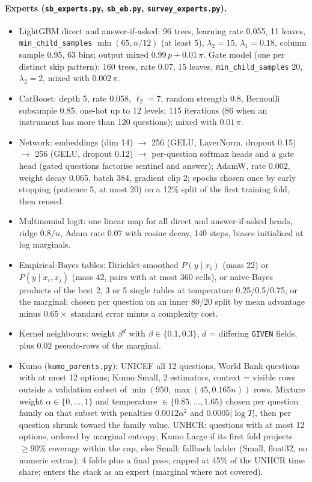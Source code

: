 \paragraph{Experts (\texttt{sb\_experts.py}, \texttt{sb\_eb.py}, \texttt{survey\_experts.py}).}
\begin{itemize}[leftmargin=*,itemsep=1pt]
\item LightGBM direct and answer-if-asked: 96 trees, learning rate 0.055, 11 leaves, \texttt{min\_child\_samples} $\min(65,n/12)$ (at least 5), $\lambda_2=15$, $\lambda_1=0.18$, column sample 0.95, 63 bins; output mixed $0.99\,p+0.01\,\pi$. Gate model (one per distinct skip pattern): 160 trees, rate 0.07, 15 leaves, \texttt{min\_child\_samples} 20, $\lambda_2=2$, mixed with $0.002\,\pi$.
\item CatBoost: depth 5, rate 0.058, $\ell_2=7$, random strength 0.8, Bernoulli subsample 0.85, one-hot up to 12 levels; 115 iterations (86 when an instrument has more than 120 questions); mixed with $0.01\,\pi$.
\item Network: embeddings (dim 14) $\to$ 256 (GELU, LayerNorm, dropout 0.15) $\to$ 256 (GELU, dropout 0.12) $\to$ per-question softmax heads and a gate head (gated questions factorise sentinel and answer); AdamW, rate 0.002, weight decay 0.065, batch 384, gradient clip 2; epochs chosen once by early stopping (patience 5, at most 20) on a 12\% split of the first training fold, then reused.
\item Multinomial logit: one linear map for all direct and answer-if-asked heads, ridge 0.8$/n$, Adam rate 0.07 with cosine decay, 140 steps, biases initialised at log marginals.
\item Empirical-Bayes tables: Dirichlet-smoothed $P(y\mid x_i)$ (mass 22) or $P(y\mid x_i,x_j)$ (mass 42, pairs with at most 360 cells), or naive-Bayes products of the best 2, 3 or 5 single tables at temperature 0.25/0.5/0.75, or the marginal; chosen per question on an inner 80/20 split by mean advantage minus $0.65\times$ standard error minus a complexity cost.
\item Kernel neighbours: weight $\beta^{d}$ with $\beta\in\{0.1,0.3\}$, $d$ = differing \texttt{GIVEN} fields, plus 0.02 pseudo-rows of the marginal.
\item Kumo (\texttt{kumo\_parents.py}): UNICEF all 12 questions, World Bank questions with at most 12 options; Kumo Small, 2 estimators, context = visible rows outside a validation subset of $\min(950,\max(45,0.165n))$ rows. Mixture weight $\alpha\in\{0,\dots,1\}$ and temperature $\in\{0.85,\dots,1.65\}$ chosen per question family on that subset with penalties $0.0012\alpha^2$ and $0.0005|\log T|$, then per question shrunk toward the family value. UNHCR: questions with at most 12 options, ordered by marginal entropy; Kumo Large if its first fold projects $\ge 90\%$ coverage within the cap, else Small; fallback ladder (Small, float32, no numeric extras); 4 folds plus a final pass; capped at 45\% of the UNHCR time share; enters the stack as an expert (marginal where not covered).
\end{itemize}

